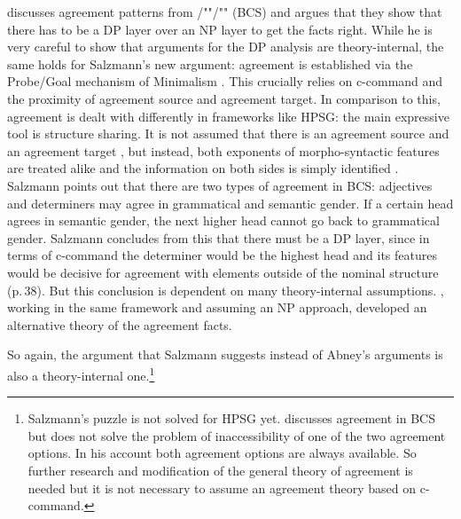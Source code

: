 \documentclass[output=paper
  ,nobabel
  ,draftmode
  ,uniformtopskip %
  ,colorlinks, citecolor=brown
]{langscibook}
\begin{document}
\citet[Section~4.3]{Salzmann2020a} discusses agreement patterns from
/""/"" (BCS) and argues that they show that there has to be a DP layer over an
NP layer to get the facts right. While he is very careful to show that  arguments
for the DP analysis are theory-internal, the same holds for Salzmann's new argument: agreement is
established via the Probe/Goal mechanism of Minimalism \citep{Chomsky2001a-u}. This crucially relies
on c-command and the proximity of agreement source and agreement target. In comparison to this,
agreement is dealt with differently in frameworks like HPSG: the main expressive tool is structure
sharing. It is not assumed that there is an agreement source and an agreement target
\citep[Section~2.2]{ps2}, but instead, both exponents of morpho-syntactic features are treated alike
and the information on both sides is simply identified
\parencites[Chapter~2]{ps2}{Kathol99b}{WZ2003a}{VanEynde2021a}. Salzmann points out that there are
two types of agreement in BCS: adjectives and determiners may agree in grammatical and semantic
gender. If a certain head agrees in semantic gender, the next higher head cannot go back to
grammatical gender. Salzmann concludes from this that there must be a DP layer, since in terms of
c-command the determiner would be the highest head and its features would be decisive for agreement
with elements outside of the nominal structure (p.\,38). But this conclusion is dependent on many
theory-internal assumptions. \citet[Section~4]{Bruening2020a}, working in the same framework and
assuming an NP approach, developed an alternative theory of the agreement facts.

So again, the argument that Salzmann suggests instead of Abney's arguments is also a
theory-internal one.\footnote{
  Salzmann's puzzle is not solved for HPSG yet. \citet{VanEynde2020b} discusses agreement in BCS but
  does not solve the problem of inaccessibility of one of the two agreement options. In his account
  both agreement options are always available. So further research and modification of the general theory of
  agreement is needed but it is not necessary to assume an agreement theory based on c-command.
}
\end{document}
